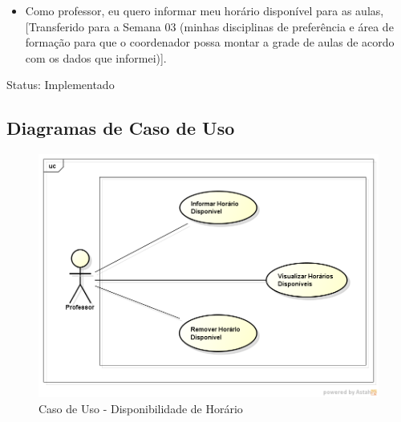\documentclass{abnt}
\begin{document}
		\begin{itemize}
			\item Como professor, eu quero informar meu horário disponível para as aulas, [Transferido para a Semana 03 (minhas disciplinas de preferência 
			e área de formação para que o coordenador possa montar a grade de aulas de acordo com os dados que informei)].
		\end{itemize}
		
		Status: Implementado
			
		\subsection{Diagramas de Caso de Uso}
		\begin{figure}[h]
			\begin{center}
				 \includegraphics[width=500px]{CasoUsoDisponibilidadeHorario}
				 \caption{Caso de Uso - Disponibilidade de Horário}
				 \label{fig:CasoUsoDisponibilidadeHorario}
			\end{center}
		\end{figure}
		\FloatBarrier
\end{document}
